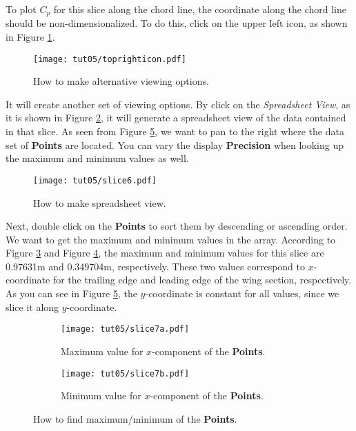 To plot $C_p$ for this slice along the chord line, the coordinate along the chord line should be non-dimensionalized. To do this, click on the upper left icon, as shown in Figure \ref{fig5:toprighticon}.
\begin{figure}[htbp]
    \centering
    \texttt{[image: tut05/toprighticon.pdf]}
    \caption{How to make alternative viewing options.}
    \label{fig5:toprighticon}
\end{figure}
It will create another set of viewing options. By click on the \textit{Spreadsheet View}, as it is shown in Figure \ref{fig5:slice6}, it will generate a spreadsheet view of the data contained in that slice. As seen from Figure \ref{fig5:slice7}, we want to pan to the right where the data set of \textbf{Points} are located. You can vary the display \textbf{Precision} when looking up the maximum and minimum values as well.
\begin{figure}[htbp]
    \centering
    \texttt{[image: tut05/slice6.pdf]}
    \caption{How to make spreadsheet view.}
    \label{fig5:slice6}
\end{figure}
Next, double click on the \textbf{Points} to sort them by descending or ascending order. We want to get the maximum and minimum values in the array. According to Figure \ref{fig5:slice7 a} and Figure \ref{fig5:slice7 b}, the maximum and minimum values for this slice are 0.97631m and 0.349704m, respectively. These two values correspond to $x$-coordinate for the trailing edge and leading edge of the wing section, respectively. As you can see in Figure \ref{fig5:slice7}, the $y$-coordinate is constant for all values, since we slice it along $y$-coordinate.
\begin{figure}[htbp]
    \centering
     \begin{subfigure}[b]{.85\textwidth}
         \centering
         \texttt{[image: tut05/slice7a.pdf]}
         \caption{Maximum value for $x$-component of the \textbf{Points}.}
         \label{fig5:slice7 a}
     \end{subfigure}
     \hfill
     \begin{subfigure}[b]{.85\textwidth}
         \centering
         \texttt{[image: tut05/slice7b.pdf]}
         \caption{Minimum value for $x$-component of the \textbf{Points}.}
         \label{fig5:slice7 b}
     \end{subfigure}     
    \caption{How to find maximum/minimum of the \textbf{Points}.}
    \label{fig5:slice7}
\end{figure}
